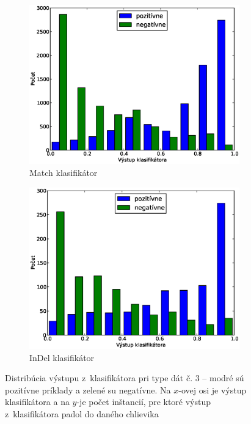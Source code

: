 \begin{figure}[htp]
        \centering
        \begin{subfigure}[t]{0.4\textwidth}
                \includegraphics[width=\textwidth]{images/clf_fi/randomforest_fullcmp_5_test}
                \caption{Match klasifikátor}
                \label{fig:datatype3-out-m}
        \end{subfigure}%
        \qquad\qquad %
        \begin{subfigure}[t]{0.4\textwidth}
                \includegraphics[width=\textwidth]{images/clf_fi/randomforest_fullcmp_5_indel_test}
                \caption{InDel klasifikátor}
                \label{fig:datatype3-out-i}
        \end{subfigure}
        \caption[Distribúcia výstupu z~klasifikátora pri type dát č. 3]{Distribúcia výstupu z~klasifikátora pri type dát č. 3 -- modré sú pozitívne príklady a zelené su negatívne. Na $x$-ovej osi je výstup klasifikátora a na $y$-je počet inštancií, pre ktoré výstup z~klasifikátora padol do daného chlievika}
        \label{fig:datatype3-out}
\end{figure}

